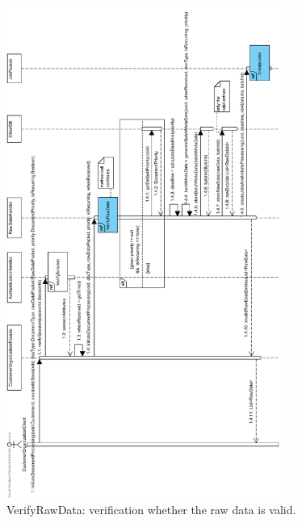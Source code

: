 \documentclass[a4paper,10pt]{article}
\begin{document}
\begin{figure}[!htp]
    \centering
    \includegraphics[width=0.8\textwidth]{Seq_UC3InitiateDocumentProcessing.png}
    \caption{VerifyRawData: verification whether the raw data is valid.
        }\label{fig:seq_UC3InitiateDocumentProcessing}
\end{figure}
\end{document}
